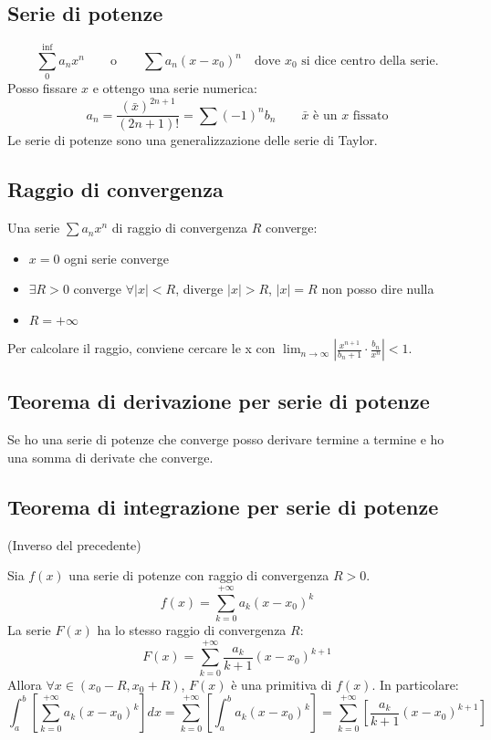 \documentclass[10pt,a4paper,fleqn]{article}
\begin{document}
	\subsection{Serie di potenze}

	\begin{equation}
	\sum_0^{\inf} a_n x^n\qquad \text{o} \qquad \sum a_n(x-x_0)^n \quad \text{dove $x_0$ si dice centro della serie.}
	\end{equation}
	Posso fissare $x$ e ottengo una serie numerica:
	\begin{equation}
	{a_n}=\frac{(\bar x)^{2n+1}}{(2n+1)!}=\sum(-1)^nb_n \qquad\text{$\bar x$ è un $x$ fissato}
	\end{equation}
	Le serie di potenze sono una generalizzazione delle serie di Taylor.

	\subsection{Raggio di convergenza}

	Una serie $\sum a_nx^n$ di raggio di convergenza $R$ converge:
	\begin{itemize}
	\item $x=0$ ogni serie converge
	\item $\exists R>0$ converge $\forall |x|<R$, diverge $|x|>R$, $|x|=R$ non posso dire nulla
	\item $R=+\infty$
	\end{itemize}
	Per calcolare il raggio, conviene cercare le x con $\lim_{n\to\infty} \left| \frac{x^{n+1}}{b_n + 1}\cdot\frac{b_n}{x^n}\right|<1$.

	\subsection{Teorema di derivazione per serie di potenze}

	Se ho una serie di potenze che converge posso derivare termine a termine e ho una somma di derivate che converge.

	\subsection{Teorema di integrazione per serie di potenze} (Inverso del precedente)

	Sia $f(x)$ una serie di potenze con raggio di convergenza $R>0$.
	\begin{equation}
		f(x) = \sum_{k=0}^{+\infty}a_k(x-x_0)^k
	\end{equation}
	La serie $F(x)$ ha lo stesso raggio di convergenza $R$:
	\begin{equation}
		F(x) = \sum_{k=0}^{+\infty}\frac{a_k}{k+1}(x-x_0)^{k+1}
	\end{equation}
	Allora $\forall x \in (x_0 - R, x_0 + R)$, $F(x)$ è una primitiva di $f(x)$. In particolare:
	\begin{equation}
		\int_a^b \left[ \sum_{k=0}^{+\infty}a_k(x-x_0)^k\right] dx = \sum_{k=0}^{+\infty}\left[ \int_a^b a_k(x-x_0)^k\right] = \sum_{k=0}^{+\infty}\left[\frac{a_k}{k+1}(x-x_0)^{k+1}\right]
	\end{equation}
\end{document}
